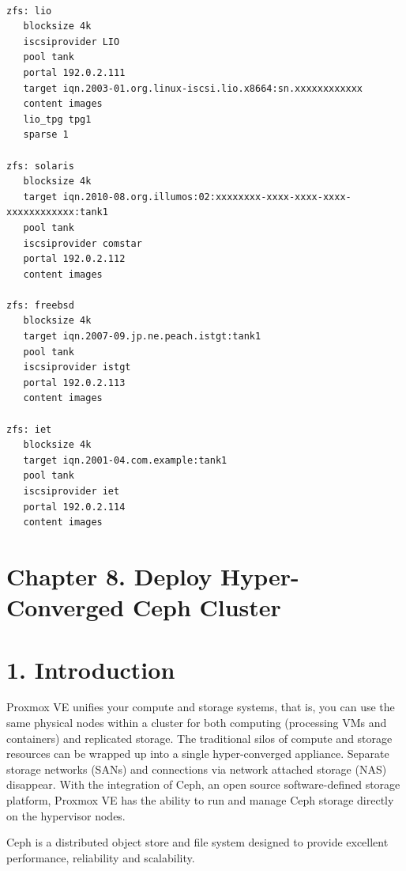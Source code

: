 \begin{lstlisting}

zfs: lio
   blocksize 4k
   iscsiprovider LIO
   pool tank
   portal 192.0.2.111
   target iqn.2003-01.org.linux-iscsi.lio.x8664:sn.xxxxxxxxxxxx
   content images
   lio_tpg tpg1
   sparse 1

zfs: solaris
   blocksize 4k
   target iqn.2010-08.org.illumos:02:xxxxxxxx-xxxx-xxxx-xxxx-xxxxxxxxxxxx:tank1
   pool tank
   iscsiprovider comstar
   portal 192.0.2.112
   content images

zfs: freebsd
   blocksize 4k
   target iqn.2007-09.jp.ne.peach.istgt:tank1
   pool tank
   iscsiprovider istgt
   portal 192.0.2.113
   content images

zfs: iet
   blocksize 4k
   target iqn.2001-04.com.example:tank1
   pool tank
   iscsiprovider iet
   portal 192.0.2.114
   content images

\end{lstlisting}

\begin{table}[htbp]

\centering

\begin{tabular}

\end{tabular}

\end{table}


\section{Chapter 8. Deploy Hyper-Converged Ceph Cluster}


\section{1. Introduction}

Proxmox VE unifies your compute and storage systems, that is, you can use the same physical nodes within a cluster for both computing (processing VMs and containers) and replicated storage. The traditional silos of compute and storage resources can be wrapped up into a single hyper-converged appliance. Separate storage networks (SANs) and connections via network attached storage (NAS) disappear. With the integration of Ceph, an open source software-defined storage platform, Proxmox VE has the ability to run and manage Ceph storage directly on the hypervisor nodes.

Ceph is a distributed object store and file system designed to provide excellent performance, reliability and scalability.

